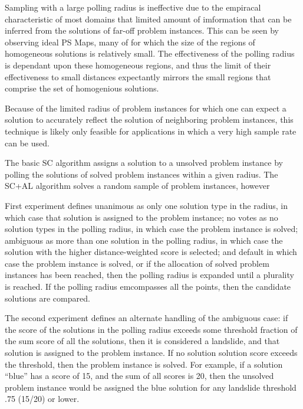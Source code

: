 \documentclass[letterpaper]{article}
\begin{document}
Sampling with a large polling radius is ineffective due to the empiracal characteristic of most domains that limited amount of imformation that can be inferred from the solutions of far-off problem instances.  This can be seen by observing ideal PS Maps, many of for which the size of the regions of homogeneous solutions is relatively small.  The effectiveness of the polling radius is dependant upon these homogeneous regions, and thus the limit of their effectiveness to small distances expectantly mirrors the small regions that comprise the set of homogenious solutions.

Because of the limited radius of problem instances for which one can expect a solution to accurately reflect the solution of neighboring problem instances, this technique is likely only feasible for applications in which a very high sample rate can be used.


The basic SC algorithm assigns a solution to a unsolved problem instance by polling the solutions of solved problem instances within a given radius.  The SC+AL algorithm solves a random sample of problem instances, however

First experiment defines unanimous as only one solution type in the radius, in which case that solution is assigned to the problem instance; no votes as no solution types in the polling radius, in which case the problem instance is solved; ambiguous as more than one solution in the polling radius, in which case the solution with the higher distance-weighted score is selected; and default in which case the problem instance is solved, or if the allocation of solved problem instances has been reached, then the polling radius is expanded until a plurality is reached.  If the polling radius emcompasses all the points, then the candidate solutions are compared.

The second experiment defines an alternate handling of the ambiguous case:  if the score of the solutions in the polling radius exceeds some threshold fraction of the sum score of all the solutions, then it is considered a landslide, and that solution is assigned to the problem instance.  If no solution solution score exceeds the threshold, then the problem instance is solved.  For example, if a solution ``blue'' has a score of 15, and the sum of all scores is 20, then the unsolved problem instance would be assigned the blue solution for any landslide threshold .75 (15/20) or lower.
\end{document}
